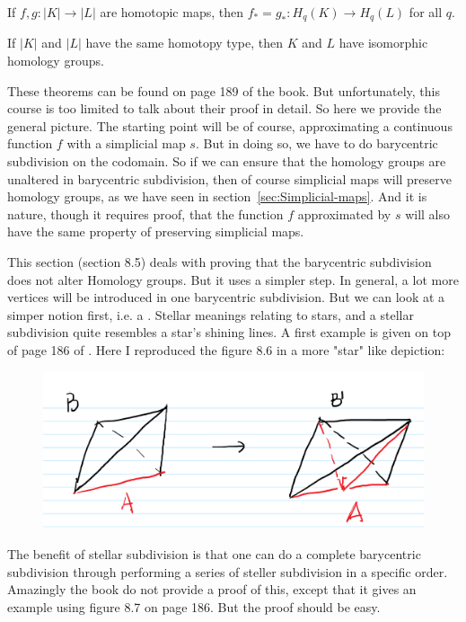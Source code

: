 \begin{thm}
    If $f,g:|K|\to |L|$ are homotopic maps, then $f_*=g_*:H_q(K)\to
    H_q(L)$ for all $q$.
\end{thm}

\begin{coro}
    If $|K|$ and $|L|$ have the same homotopy type, then $K$ and $L$
    have isomorphic homology groups.
\end{coro}

These theorems can be found on page 189 of the book\cite{book}. But
unfortunately, this course is too limited to talk about their proof in
detail. So here we provide the general picture. The starting point
will be of course, approximating a continuous function $f$ with a
simplicial map $s$. But in doing so, we have to do barycentric
subdivision on the codomain. So if we can ensure that the homology
groups are unaltered in barycentric subdivision, then of course
simplicial maps will preserve homology groups, as we have seen in
section~\ref{sec:Simplicial-maps}. And it is nature, though it
requires proof, that the function $f$ approximated by $s$ will also
have the same property of preserving simplicial maps.

This section (section 8.5) deals with proving that the barycentric
subdivision does not alter Homology groups. But it uses a simpler
step. In general, a lot more vertices will be introduced in one
barycentric subdivision. But we can look at a simper notion first,
i.e. a . Stellar meanings relating to
stars, and a stellar subdivision quite resembles a star's shining
lines. A first example is given on top of page 186 of \cite{book}.
Here I reproduced the figure 8.6 in a more "star" like depiction:

\begin{figure}[H]
    \centering
    \includegraphics[width=0.9\linewidth]{pics/ch8/stellar-subd-ex.pdf}
\end{figure}

The benefit of stellar subdivision is that one can do a complete
barycentric subdivision through performing a series of steller subdivision
in a specific order. Amazingly the book\cite{book} do not provide a
proof of this, except that it gives an example using figure 8.7 on
page 186. But the proof should be easy. 


